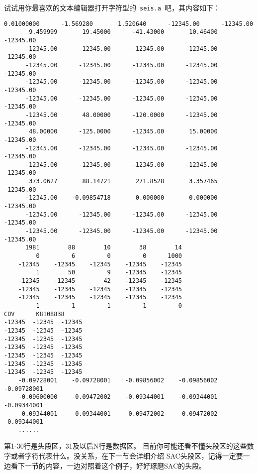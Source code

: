 试试用你最喜欢的文本编辑器打开字符型的~\lstinline{seis.a}~吧，其内容如下：
\begin{lstlisting}[style=Bash]
     0.01000000      -1.569280       1.520640      -12345.00      -12345.00
       9.459999       19.45000      -41.43000       10.46400      -12345.00
      -12345.00      -12345.00      -12345.00      -12345.00      -12345.00
      -12345.00      -12345.00      -12345.00      -12345.00      -12345.00
      -12345.00      -12345.00      -12345.00      -12345.00      -12345.00
      -12345.00      -12345.00      -12345.00      -12345.00      -12345.00
      -12345.00       48.00000      -120.0000      -12345.00      -12345.00
       48.00000      -125.0000      -12345.00       15.00000      -12345.00
      -12345.00      -12345.00      -12345.00      -12345.00      -12345.00
      -12345.00      -12345.00      -12345.00      -12345.00      -12345.00
       373.0627       88.14721       271.8528       3.357465      -12345.00
      -12345.00    -0.09854718       0.000000       0.000000      -12345.00
      -12345.00      -12345.00      -12345.00      -12345.00      -12345.00
      -12345.00      -12345.00      -12345.00      -12345.00      -12345.00
      1981        88        10        38        14  
         0         6         0         0      1000
    -12345    -12345    -12345    -12345    -12345
         1        50         9    -12345    -12345
    -12345    -12345        42    -12345    -12345
    -12345    -12345    -12345    -12345    -12345
    -12345    -12345    -12345    -12345    -12345
         1         1         1         1         0   
CDV      K8108838    
-12345  -12345  -12345  
-12345  -12345  -12345  
-12345  -12345  -12345  
-12345  -12345  -12345  
-12345  -12345  -12345  
-12345  -12345  -12345  
-12345  -12345  -12345  
    -0.09728001    -0.09728001    -0.09856002    -0.09856002    -0.09728001
    -0.09600000    -0.09472002    -0.09344001    -0.09344001    -0.09344001
    -0.09344001    -0.09344001    -0.09472002    -0.09472002    -0.09344001
    ......
\end{lstlisting}

第1-30行是头段区，31及以后N行是数据区。
目前你可能还看不懂头段区的这些数字或者字符代表什么。没关系，在下一节会详细介绍
SAC头段区，记得一定要一边看下一节的内容，一边对照着这个例子，好好琢磨SAC的头段。
